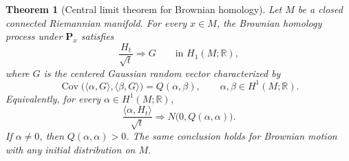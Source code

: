 \documentclass[a4paper,reqno]{amsart}
\newcommand{\R}{\mathbb R}
\newcommand{\Pp}{\mathbf P}
\newtheorem{theorem}{Theorem}[section]
\theoremstyle{definition}
\begin{document}
\begin{theorem}[Central limit theorem for Brownian homology]\label{thm:main}
Let $M$ be a closed connected Riemannian manifold.  For every $x\in M$, the Brownian homology process under $\Pp_x$ satisfies
\begin{equation}\label{eq:mainCLT}
   \frac{H_t}{\sqrt t}\Longrightarrow G
   \qquad\text{in }H_1(M;\R),
\end{equation}
where $G$ is the centered Gaussian random vector characterized by
\begin{equation}\label{eq:covG}
   \operatorname{Cov}
   \bigl(\langle\alpha,G\rangle,
         \langle\beta,G\rangle\bigr)
   =Q(\alpha,\beta),
   \qquad \alpha,\beta\in H^1(M;\R).
\end{equation}
Equivalently, for every $\alpha\in H^1(M;\R)$,
\begin{equation}\label{eq:scalarCLT}
   \frac{\langle\alpha,H_t\rangle}{\sqrt t}
   \Longrightarrow
   N\bigl(0,Q(\alpha,\alpha)\bigr).
\end{equation}
If $\alpha\ne0$, then $Q(\alpha,\alpha)>0$.  The same conclusion holds for Brownian motion with any initial distribution on $M$.
\end{theorem}
\end{document}
